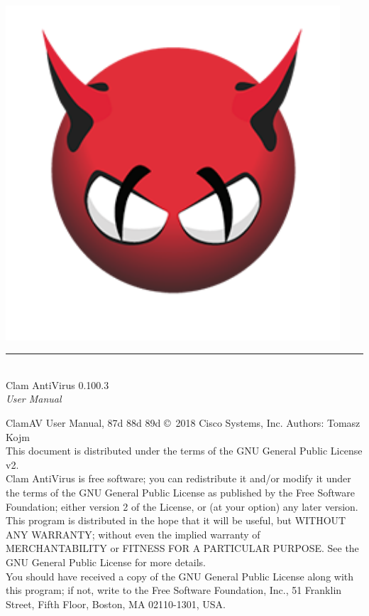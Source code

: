 \documentclass[a4paper,titlepage,12pt]{article}
\date{}
\begin{document}
    \setcounter{page}{0}

    \pagestyle{empty}
    \includegraphics[width=353pt]{html/demon.png}
    \vspace{3cm}
    \begin{flushright}
	\rule[-1ex]{8cm}{3pt}\\
	\huge Clam AntiVirus 0.100.3\\
	\huge \emph{User Manual}\\
    \end{flushright}

    \newpage
    \pagestyle{fancy}
    \tableofcontents
    \vspace{1.0cm}

    \noindent
    \begin{boxedminipage}[b]{\textwidth}
    ClamAV User Manual,
87d
88d
89d
    \copyright \  2018 Cisco Systems, Inc.
    Authors: Tomasz Kojm\\
    This document is distributed under the terms of the GNU General
    Public License v2.\\

    Clam AntiVirus is free software; you can redistribute it and/or modify
    it under the terms of the GNU General Public License as published by
    the Free Software Foundation; either version 2 of the License, or
    (at your option) any later version.\\

    This program is distributed in the hope that it will be useful,
    but WITHOUT ANY WARRANTY; without even the implied warranty of
    MERCHANTABILITY or FITNESS FOR A PARTICULAR PURPOSE.  See the
    GNU General Public License for more details.\\

    You should have received a copy of the GNU General Public License
    along with this program; if not, write to the Free Software
    Foundation, Inc., 51 Franklin Street, Fifth Floor, Boston,
    MA 02110-1301, USA.
    \end{boxedminipage}
\end{document}
